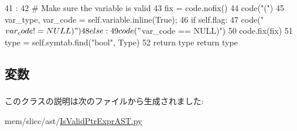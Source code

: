 \begin{DoxyCode}
41                             :
42         # Make sure the variable is valid
43         fix = code.nofix()
44         code("(")
45         var_type, var_code = self.variable.inline(True);
46         if self.flag:
47             code("${var_code} != NULL)")
48         else:
49             code("${var_code} == NULL)")
50         code.fix(fix)
51         type = self.symtab.find("bool", Type)
52         return type
        return type
\end{DoxyCode}


\subsection{変数}
\hypertarget{classslicc_1_1ast_1_1IsValidPtrExprAST_1_1IsValidPtrExprAST_a7847560c748814fd3070e9149a9578bd}{
\subsubsection[{flag}]{}}
\label{classslicc_1_1ast_1_1IsValidPtrExprAST_1_1IsValidPtrExprAST_a7847560c748814fd3070e9149a9578bd}
\hypertarget{classslicc_1_1ast_1_1IsValidPtrExprAST_1_1IsValidPtrExprAST_a9cd756653e5b34f63d5cf5c342143cb5}{
\subsubsection[{variable}]{}}
\label{classslicc_1_1ast_1_1IsValidPtrExprAST_1_1IsValidPtrExprAST_a9cd756653e5b34f63d5cf5c342143cb5}


このクラスの説明は次のファイルから生成されました:\begin{DoxyCompactItemize}
\item 
mem/slicc/ast/\hyperlink{IsValidPtrExprAST_8py}{IsValidPtrExprAST.py}\end{DoxyCompactItemize}
